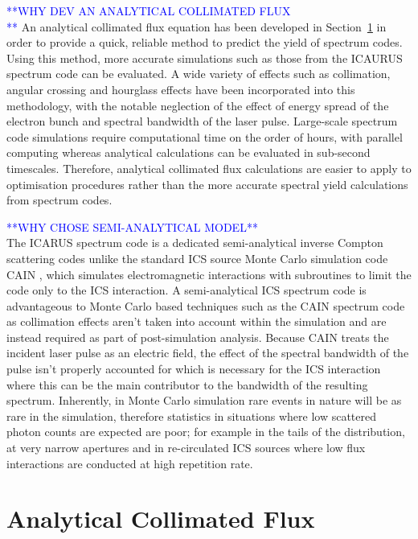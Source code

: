 \documentclass[../main.tex]{subfiles}
\begin{document}
\textcolor{blue}{**WHY DEV AN ANALYTICAL COLLIMATED FLUX \\**}
An analytical collimated flux equation has been developed in Section~\ref{sec:analytical_collimated_flux} in order to provide a quick, reliable method to predict the yield of spectrum codes. Using this method, more accurate simulations such as those from the \textsc{ICAURUS} spectrum code can be evaluated. A wide variety of effects such as collimation, angular crossing and hourglass effects have been incorporated into this methodology, with the notable neglection of the effect of energy spread of the electron bunch and spectral bandwidth of the laser pulse. Large-scale spectrum code simulations require computational time on the order of hours, with parallel computing whereas analytical calculations can be evaluated in sub-second timescales. Therefore, analytical collimated flux calculations are easier to apply to optimisation procedures rather than the more accurate spectral yield calculations from spectrum codes.   

\textcolor{blue}{**WHY CHOSE SEMI-ANALYTICAL MODEL**\\}
The \textsc{ICARUS} spectrum code is a dedicated semi-analytical inverse Compton scattering codes unlike the standard ICS source Monte Carlo simulation code \textsc{CAIN} \cite{chen1995cain}, which simulates electromagnetic interactions with subroutines to limit the code only to the ICS interaction. A semi-analytical ICS spectrum code is advantageous to Monte Carlo based techniques such as the \textsc{CAIN}  spectrum code as  collimation effects aren't taken into account within the simulation and are instead required as part of post-simulation analysis. Because \textsc{CAIN} treats the incident laser pulse as an electric field, the effect of the spectral bandwidth of the pulse isn't properly accounted for which is necessary for the ICS interaction where this can be the main contributor to the bandwidth of the resulting spectrum. Inherently, in Monte Carlo simulation rare events in nature will be as rare in the simulation, therefore statistics in situations where low scattered photon counts are expected are poor; for example in the tails of the distribution, at very narrow apertures \cite{ranjan2018simulation} and in re-circulated ICS sources where low flux interactions are conducted at high repetition rate. 

\section{Analytical Collimated Flux}
\label{sec:analytical_collimated_flux}
\end{document}
